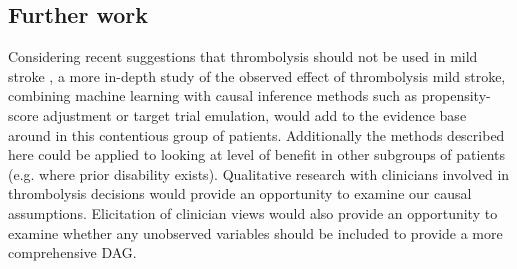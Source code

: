 \subsection{Further work}

Considering recent suggestions that thrombolysis should not be used in mild stroke \cite{braksick_thrombolysis_2024, zhang_intravenous_2024}, a more in-depth study of the observed effect of thrombolysis mild stroke, combining machine learning with causal inference methods such as propensity-score adjustment or target trial emulation, would add to the evidence base around in this contentious group of patients. Additionally the methods described here could be applied to looking at level of benefit in other subgroups of patients (e.g. where prior disability exists). Qualitative research with clinicians involved in thrombolysis decisions would provide an opportunity to examine our causal assumptions. Elicitation of clinician views would also provide an opportunity to examine whether any unobserved variables should be included to provide a more comprehensive DAG. 
